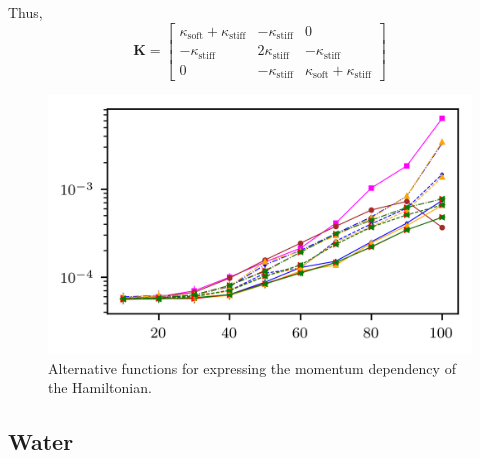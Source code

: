 \documentclass[
aip,
jcp,
reprint,
]{revtex4-1}
\newcommand{\mt}[1]{\boldsymbol{\mathbf{#1}}}          %
\begin{document}
Thus,
\begin{equation*}
{\mt K} = \begin{bmatrix}
\kappa_\mathrm{soft} + \kappa_\mathrm{stiff} & -\kappa_\mathrm{stiff} & 0 \\
-\kappa_\mathrm{stiff} & 2 \kappa_\mathrm{stiff} & -\kappa_\mathrm{stiff} \\
0 & -\kappa_\mathrm{stiff} & \kappa_\mathrm{soft} + \kappa_\mathrm{stiff}
\end{bmatrix}
\end{equation*}



\begin{figure}
	\centering
	\includegraphics{linear_resonance}
	\caption{Alternative functions for expressing the momentum dependency of the Hamiltonian.}
	\label{fig:linear resonance}
\end{figure}


\subsection{Water}
\end{document}
